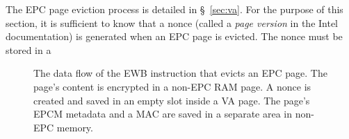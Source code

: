 
The EPC page eviction process is detailed in \S~\ref{sec:va}. For the purpose
of this section, it is sufficient to know that a nonce (called a \textit{page
version} in the Intel documentation) is generated when an EPC page is evicted.
The nonce must be stored in a


\begin{figure}[hbt!]
  \caption{
    The data flow of the EWB instruction that evicts an EPC page. The page's
    content is encrypted in a non-EPC RAM page. A nonce is created and saved
    in an empty slot inside a VA page. The page's EPCM metadata and a MAC
    are saved in a separate area in non-EPC memory.
  }
  \label{fig:sgx_ewb}
\end{figure}







